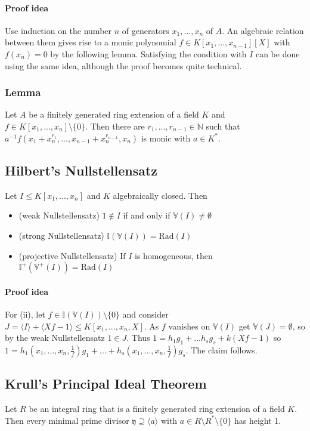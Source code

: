 \documentclass{scrartcl}
\newcommand{\N}{\mathbb{N}}
\newcommand{\I}{\mathbb{I}}
\newcommand{\V}{\mathbb{V}}
\begin{document}
\paragraph{Proof idea} Use induction on the number $n$ of generators $x_1, ..., x_n$ of $A$. 
An algebraic relation between them gives rise to a monic polynomial $f \in K[x_1, ..., x_{n - 1}][X]$ with $f(x_n) = 0$ by the following lemma.
Satisfying the condition with $I$ can be done using the same idea, although the proof becomes quite technical.

\subsubsection{Lemma}
Let $A$ be a finitely generated ring extension of a field $K$ and $f \in K[x_1, ..., x_n] \setminus \{0\}$.
Then there are $r_1, ..., r_{n - 1} \in \N$ such that $a^{-1}f(x_1 + x_n^{r_1}, ..., x_{n - 1} + x_n^{r_{n - 1}}, x_n)$ is monic with $a \in K^*$.

\subsection{Hilbert's Nullstellensatz}
Let $I \leq K[x_1, ..., x_n]$ and $K$ algebraically closed. Then
\begin{itemize}
    \item (weak Nullstellensatz) $1 \notin I$ if and only if $\V(I) \neq \emptyset$
    \item (strong Nullstellensatz) $\I(\V(I)) = \mathrm{Rad}(I)$
    \item (projective Nullstellensatz) If $I$ is homogeneous, then $\I^+(\V^+(I)) = \mathrm{Rad}(I)$
\end{itemize}
\paragraph{Proof idea} For (ii), let $f \in \I(\V(I)) \setminus \{0\}$ and consider $J = \langle I \rangle + \langle Xf - 1 \rangle \leq K[x_1, ..., x_n, X]$.
As $f$ vanishes on $\V(I)$ get $\V(J) = \emptyset$, so by the weak Nullstellensatz $1 \in J$.
Thus $1 = h_1 g_1 + ... h_s g_s + k(Xf - 1)$ so $1 = h_1(x_1, ..., x_n, \frac 1 f) g_1 + ... + h_s(x_1, ..., x_n, \frac 1 f) g_s$.
The claim follows.

\subsection{Krull's Principal Ideal Theorem}
\label{krulls_pit}
Let $R$ be an integral ring that is a finitely generated ring extension of a field $K$.
Then every minimal prime divisor $\mathfrak{y} \supseteq \langle a \rangle$ with $a \in R \setminus R^* \setminus \{ 0 \}$ has height 1.
\end{document}
